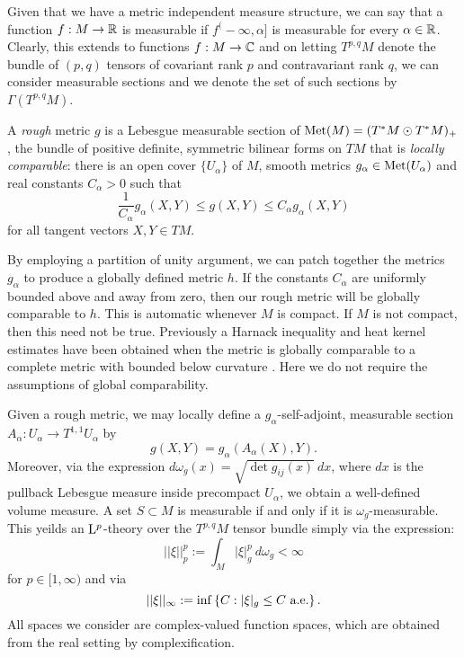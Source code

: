 \documentclass[a4paper, 12pt]{amsart}
\begin{document}
Given that we have a metric independent measure structure, we can say that a function
$f: M \to \mathbb{R}$ is measurable if $f^(-\infty, \alpha]$ is measurable for every $\alpha  \in \mathbb{R}$.
Clearly, this extends to functions $f:M \to \mathbb{C}$ and on letting
 $T^{p,q}M$ denote the bundle of $(p,q)$ tensors of covariant rank $p$ and contravariant rank $q$,
we can consider measurable sections and we denote the set of such 
sections by $\Gamma(T^{p,q}M)$. 

\begin{defn}
A \emph{rough} metric \(g\) is a Lebesgue measurable section of \(\operatorname{Met}(M) = (T^{\ast} M \odot T^{\ast} M)_+\), the bundle of positive definite, symmetric bilinear forms on \(TM\) that is \emph{locally comparable}: there is an open cover \(\lbrace U_{\alpha} \rbrace\) of \(M\), smooth metrics \(g_{\alpha} \in \operatorname{Met}(U_{\alpha})\) and real constants \(C_{\alpha} > 0\) such that
\[
\frac{1}{C_{\alpha}} g_{\alpha} (X, Y) \leq g(X, Y) \leq C_{\alpha} g_{\alpha} (X, Y)
\]
for all tangent vectors \(X, Y \in TM\).
\end{defn}

\begin{rem}
By employing a partition of unity argument, we can patch together the metrics \(g_{\alpha}\) to produce a globally defined metric \(h\). If the constants \(C_{\alpha}\) are uniformly bounded above and away from zero, then our rough metric will be globally comparable to \(h\). This is automatic whenever \(M\) is compact. If \(M\) is not compact, then this need not be true. Previously a Harnack inequality and heat kernel estimates have been obtained when the metric is globally comparable to a complete metric with bounded below curvature \cite{SC}. Here we do not require the assumptions of global comparability.
\end{rem}

Given a rough metric, we may locally define a \(g_{\alpha}\)-self-adjoint, measurable section \(A_{\alpha} : U_{\alpha} \to T^{1,1}U_{\alpha}\) by
\[
g(X, Y) = g_{\alpha} (A_{\alpha} (X), Y).
\]
Moreover, via the expression $d\omega_g(x) = \sqrt{\det g_{ij}(x)}\ dx$, where $dx$ is the pullback
Lebesgue measure inside precompact $U_\alpha$, we obtain a well-defined volume measure. 
A set $S \subset M$ is measurable if and only if it is $\omega_g$-measurable. This yeilds 
an ${\rm L}^{p}_{\rm {}}$-theory over the $T^{p,q}M$ tensor bundle simply via the expression:
$$||\xi||_p^p := \int_{M} |\xi|_{g}^p\ d\omega_g < \infty$$
for $p \in [1, \infty)$ and via
$$||\xi||_\infty := \inf\left\{C: |\xi|_g \leq C\ \text{a.e.}\right\}.$$
All spaces we consider are complex-valued function spaces, 
which are obtained from the real setting by complexification.
\end{document}
